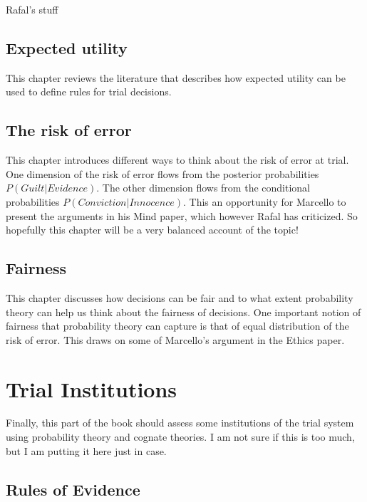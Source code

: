 \documentclass[]{book}
\begin{document}
Rafal's stuff

\chapter{Expected utility}

This chapter reviews the literature
that describes how
expected utility can be used
to define rules for trial decisions.

\chapter{The risk of error}

This chapter introduces different
ways to think about the risk
of error at trial. One dimension of the risk of error
flows from the posterior probabilities \(P(Guilt | Evidence)\).
The other dimension flows from the conditional probabilities
\(P(Conviction | Innocence)\).
This an opportunity for Marcello to present the arguments in his Mind paper,
which however Rafal has criticized. So hopefully this chapter
will be a very balanced account of the topic!

\chapter{Fairness}

This chapter discusses how decisions can be fair and to what extent probability
theory can help us think about the fairness of decisions.
One important notion of fairness that probability theory
can capture is that of equal distribution of the risk of error.
This draws on some of Marcello's argument in the Ethics paper.


\part{Trial Institutions}

Finally, this part of the book should
assess some institutions of the trial system
using probability theory and
cognate theories. I am not sure
if this is too much, but I am
putting it here just in case.


\chapter{Rules of Evidence}
\end{document}
